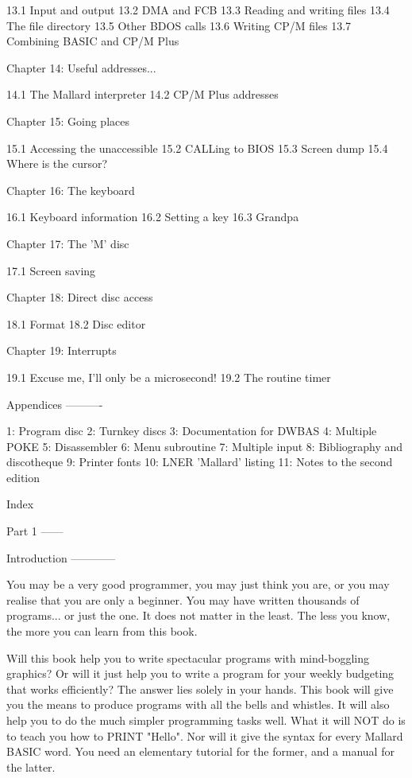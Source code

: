 13.1 Input and output
13.2 DMA and FCB
13.3 Reading and writing files
13.4 The file directory
13.5 Other BDOS calls
13.6 Writing CP/M files
13.7 Combining BASIC and CP/M Plus

Chapter 14: Useful addresses...

14.1 The Mallard interpreter
14.2 CP/M Plus addresses

Chapter 15: Going places

15.1 Accessing the unaccessible
15.2 CALLing to BIOS
15.3 Screen dump
15.4 Where is the cursor?

Chapter 16: The keyboard

16.1 Keyboard information
16.2 Setting a key
16.3 Grandpa

Chapter 17: The 'M' disc

17.1 Screen saving

Chapter 18: Direct disc access

18.1 Format
18.2 Disc editor

Chapter 19: Interrupts

19.1 Excuse me, I'll only be a microsecond!
19.2 The routine timer


Appendices
----------

1: Program disc
2: Turnkey discs
3: Documentation for DWBAS
4: Multiple POKE
5: Disassembler
6: Menu subroutine
7: Multiple input
8: Bibliography and discotheque
9: Printer fonts
10: LNER 'Mallard' listing
11: Notes to the second edition


Index


Part 1
------

Introduction
------------

You  may  be a very good programmer, you may just think you are,  or  you  may 
realise  that  you  are only a beginner. You may  have  written  thousands  of 
programs...  or  just the one. It does not matter in the least. The  less  you 
know, the more you can learn from this book.

Will  this  book  help you to write spectacular  programs  with  mind-boggling 
graphics?  Or  will  it  just help you to write  a  program  for  your  weekly 
budgeting  that works efficiently? The answer lies solely in your hands.  This 
book  will  give  you the means to produce programs with  all  the  bells  and 
whistles. It will also help you to do the much simpler programming tasks well. 
What it will NOT do is to teach you how to PRINT "Hello". Nor will it give the 
syntax  for every Mallard BASIC word. You need an elementary tutorial for  the 
former, and a manual for the latter.

